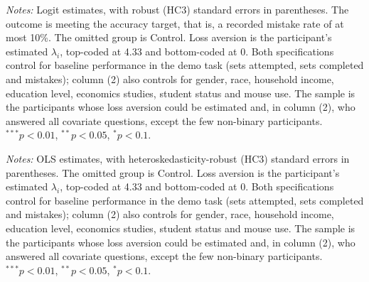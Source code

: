 \documentclass[12pt, letterpaper]{article}
\begin{document}
\begin{table}[htbp]
\centering
\caption{Treatment effects on the probability of meeting the accuracy target, interacted with loss aversion}\label{tab:reg-target-la}
\begin{threeparttable}

\begin{tablenotes}[flushleft]
\footnotesize
\item \textit{Notes:} Logit estimates, with robust (HC3) standard errors in parentheses. The outcome is meeting the accuracy target, that is, a recorded mistake rate of at most 10\%. The omitted group is Control. Loss aversion is the participant's estimated $\lambda_i$, top-coded at 4.33 and bottom-coded at 0. Both specifications control for baseline performance in the demo task (sets attempted, sets completed and mistakes); column (2) also controls for gender, race, household income, education level, economics studies, student status and mouse use. The sample is the participants whose loss aversion could be estimated and, in column (2), who answered all covariate questions, except the few non-binary participants. $^{***}p<0.01$, $^{**}p<0.05$, $^{*}p<0.1$.
\end{tablenotes}
\end{threeparttable}
\end{table}

\begin{table}[htbp]
\centering
\caption{Treatment effects on the mistake rate, interacted with loss aversion}\label{tab:reg-mistakes-la}
\begin{threeparttable}

\begin{tablenotes}[flushleft]
\footnotesize
\item \textit{Notes:} OLS estimates, with heteroskedasticity-robust (HC3) standard errors in parentheses. The omitted group is Control. Loss aversion is the participant's estimated $\lambda_i$, top-coded at 4.33 and bottom-coded at 0. Both specifications control for baseline performance in the demo task (sets attempted, sets completed and mistakes); column (2) also controls for gender, race, household income, education level, economics studies, student status and mouse use. The sample is the participants whose loss aversion could be estimated and, in column (2), who answered all covariate questions, except the few non-binary participants. $^{***}p<0.01$, $^{**}p<0.05$, $^{*}p<0.1$.
\end{tablenotes}
\end{threeparttable}
\end{table}
\end{document}
